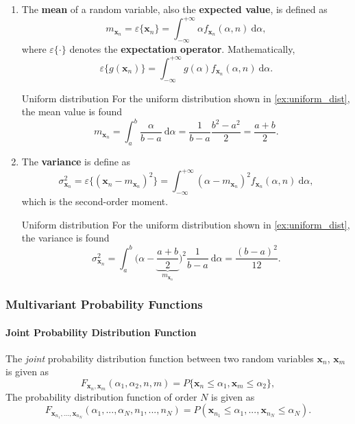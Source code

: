 \begin{enumerate}
    \item The \textbf{mean} of a random variable, also the \textbf{expected value}, is defined as
    \[
        m_{\mathbf{x}_n} = \varepsilon\{\mathbf{x}_n\} = \int_{-\infty}^{+\infty} \alpha f_{\mathbf{x}_n}(\alpha, n) \ \mathrm{d}\alpha,
    \]
    where $\varepsilon\{\cdot\}$ denotes the \textbf{expectation operator}. Mathematically,
    \[
        \varepsilon \{ g(\mathbf{x}_n) \} = \int_{-\infty}^{+\infty} g(\alpha) f_{\mathbf{x}_n}(\alpha, n) \ \mathrm{d}\alpha.
    \]

    \begin{ex}{Uniform distribution}
        For the uniform distribution shown in \autoref{ex:uniform_dist}, the mean value is found
        \[
            m_{\mathbf{x}_n} = \int_{a}^{b} \frac{\alpha}{b-a} \ \mathrm{d}\alpha
            = \frac{1}{b-a}\frac{b^2 - a^2}{2} = \frac{a+b}{2}.
        \]
    \end{ex}

    \item The \textbf{variance} is define as
    \[
        \sigma_{\mathbf{x}_n}^2 
        = \varepsilon \{ (\mathbf{x}_n - m_{\mathbf{x}_n})^2 \} 
        = \int_{-\infty}^{+\infty} (\alpha - m_{\mathbf{x}_n})^2 f_{\mathbf{x}_n}(\alpha, n) \ \mathrm{d}\alpha,
    \]
    which is the second-order moment.
    
    \begin{ex}{Uniform distribution}
        For the uniform distribution shown in \autoref{ex:uniform_dist}, the variance is found
        \[
            \sigma_{\mathbf{x}_n}^2
            = \int_{a}^{b} \bigg(\alpha - \underbrace{\frac{a+b}{2}}_{m_{\mathbf{x}_n}}\bigg)^2 \frac{1}{b-a} \ \mathrm{d}\alpha
            = \frac{(b-a)^2}{12}.
        \]
    \end{ex}
\end{enumerate}

\subsubsection{Multivariant Probability Functions}
\paragraph{Joint Probability Distribution Function} The \textit{joint} probability distribution function between two random variables $\mathbf{x}_n$,  $\mathbf{x}_m$ is given as 
\[
    F_{\mathbf{x}_n, \mathbf{x}_m}(\alpha_1, \alpha_2, n,m) = P\{\mathbf{x}_n\leq \alpha_1, \mathbf{x}_m \leq \alpha_2\},
\]
The probability distribution function of order $N$ is given as
\[
    F_{\mathbf{x}_{n_1}, ..., \mathbf{x}_{n_N}} (\alpha_1, ..., \alpha_N, n_1, ..., n_N) = P(\mathbf{x}_{n_1} \leq \alpha_{1}, ..., \mathbf{x}_{n_N} \leq \alpha_{N}).
\]

